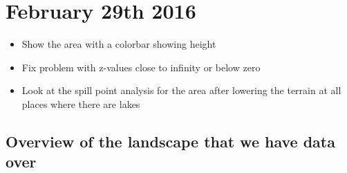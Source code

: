 \documentclass[10pt,a4paper]{article}
\begin{document}
\section{February 29th 2016}
\begin{itemize}
\item Show the area with a colorbar showing height
\item Fix problem with z-values close to infinity or below zero
\item Look at the spill point analysis for the area after lowering the terrain at all places where there are lakes
\end{itemize}

\subsection{Overview of the landscape that we have data over}
\end{document}
